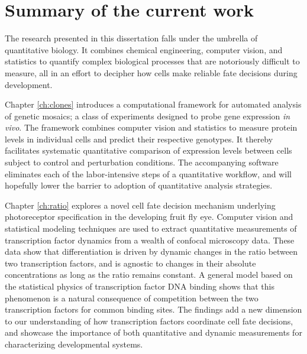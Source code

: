 \section{Summary of the current work}

The research presented in this dissertation falls under the umbrella of quantitative biology. It combines chemical engineering, computer vision, and statistics to quantify complex biological processes that are notoriously difficult to measure, all in an effort to decipher how cells make reliable fate decisions during development.

Chapter \ref{ch:clones} introduces a computational framework for automated analysis of genetic mosaics; a class of experiments designed to probe gene expression \textit{in vivo}. The framework combines computer vision and statistics to measure protein levels in individual cells and predict their respective genotypes. It thereby facilitates systematic quantitative comparison of expression levels between cells subject to control and perturbation conditions. The accompanying software eliminates each of the labor-intensive steps of a quantitative workflow, and will hopefully lower the barrier to adoption of quantitative analysis strategies. 

Chapter \ref{ch:ratio} explores a novel cell fate decision mechanism underlying photoreceptor specification in the developing fruit fly eye. Computer vision and statistical modeling techniques are used to extract quantitative measurements of transcription factor dynamics from a wealth of confocal microscopy data. These data show that differentiation is driven by dynamic changes in the ratio between two transcription factors, and is agnostic to changes in their absolute concentrations as long as the ratio remains constant. A general model based on the statistical physics of transcription factor DNA binding shows that this phenomenon is a natural consequence of competition between the two transcription factors for common binding sites. The findings add a new dimension to our understanding of how transcription factors coordinate cell fate decisions, and showcase the importance of both quantitative and dynamic measurements for characterizing developmental systems. 

